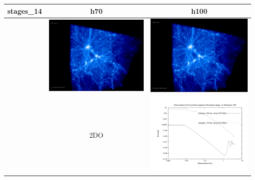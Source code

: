 \begin{itemize}
\begin{table}[p]
\centering
\begin{tabular}{l|c|c}
stages\_14 & h70 & h100 \\
\hline 
 & \includegraphics[scale=0.075]{r256/h100/stages_14/197.jpg} & \includegraphics[scale=0.075]{r256/h100/stages_14/197.jpg} \\
 & 2DO & \includegraphics[scale=0.25]{r256/h100/stages_14/plot_powspec_stages_14.pdf} \\

\end{tabular}
\end{table}
\end{itemize}
